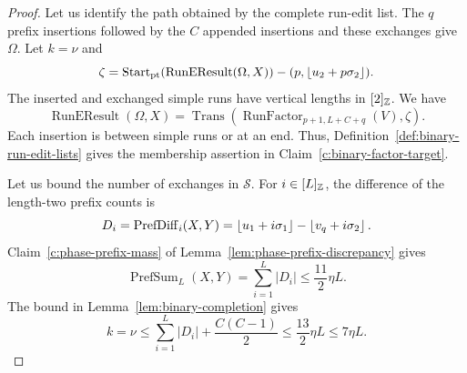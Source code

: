 \begin{proof}
Let us identify the path obtained by the complete run-edit list.
The $q$ prefix insertions followed by the $C$ appended insertions and these exchanges give $\Omega$.
Let $k=\nu$ and
\[
 \zeta=\operatorname{Start}_{\mathrm{pt}}(\operatorname{RunEResult}(\Omega,X))
       -(p,\left\lfloor u_2+p\sigma_2\right\rfloor).
\]
The inserted and exchanged simple runs have vertical lengths in $[2]_{\mathbb Z}$. We have
\[
 \operatorname{RunEResult}(\Omega,X)
 =\operatorname{Trans}(\operatorname{RunFactor}_{p+1,L+C+q}(V),\zeta).
\]
Each insertion is between simple runs or at an end.
Thus, Definition~\ref{def:binary-run-edit-lists} gives the membership assertion in Claim~\ref{c:binary-factor-target}.

 Let us bound the number of exchanges in $\mathcal S$.
For $i\in[L]_{\mathbb Z}$, the difference of the length-two prefix counts is
\[
 D_i=\operatorname{PrefDiff}_i(X,Y)=\left\lfloor u_1+i\sigma_1\right\rfloor-\left\lfloor v_q+i\sigma_2\right\rfloor.
\]
Claim~\ref{c:phase-prefix-mass} of Lemma~\ref{lem:phase-prefix-discrepancy} gives
\[
 \operatorname{PrefSum}_L(X,Y)=\sum_{i=1}^L|D_i|\le\frac{11}{2}\eta L.
\]
The bound in Lemma~\ref{lem:binary-completion} gives
\[
 k=\nu\le\sum_{i=1}^L|D_i|+\frac{C(C-1)}2
 \le\frac{13}{2}\eta L\le7\eta L.
\]
\end{proof}


